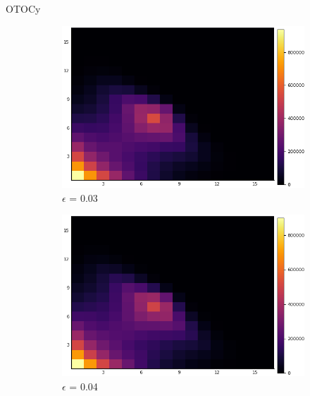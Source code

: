 \documentclass{article}
\begin{document}
\begin{section}{OTOCy}
\begin{figure}[H]
                                      \begin{subfigure}{.33\textwidth}
                                        \centering
                                        \includegraphics[width=1.0\linewidth]{nW0.03.png}
                                      \caption{$\epsilon$ = 0.03}
                                      \end{subfigure}%
                                      \begin{subfigure}{.33\textwidth}
                                        \centering
                                        \includegraphics[width=1.0\linewidth]{nW0.04.png}
                                      \caption{$\epsilon$ = 0.04}
                                      \end{subfigure}%
                                      \begin{subfigure}{.33\textwidth}

\end{subfigure}
\end{figure}
\end{section}
\end{document}
